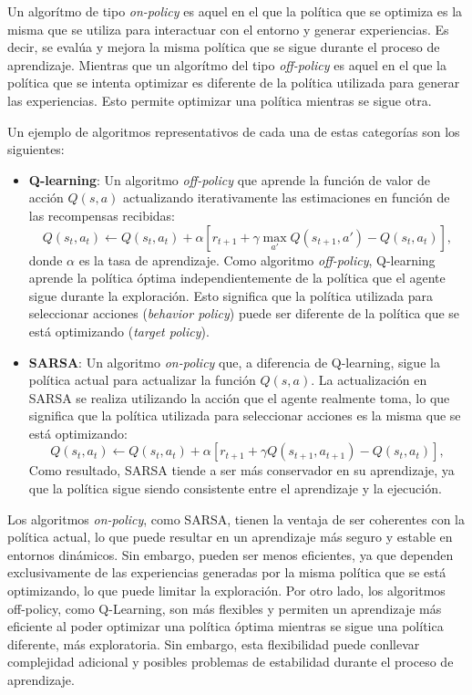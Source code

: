 \documentclass[a4paper,12pt, twoside]{report}
\begin{document}
Un algorítmo de tipo \textit{on-policy} es aquel en el que la política que se optimiza es la misma que 
se utiliza para interactuar con el entorno y generar experiencias. Es decir, se evalúa y mejora la misma
política que se sigue durante el proceso de aprendizaje. Mientras que un algorítmo del tipo \textit{off-policy}
es aquel en el que la política que se intenta optimizar es diferente de la política utilizada para generar
las experiencias. Esto permite optimizar una política mientras se sigue otra.

Un ejemplo de algoritmos representativos de cada una de estas categorías son los siguientes:

\begin{itemize}
    \item \textbf{Q-learning}: Un algoritmo \textit{off-policy} que aprende la función de valor de 
    acción \(Q(s, a)\) actualizando iterativamente las estimaciones en función de las recompensas recibidas:
    \begin{equation}
    Q(s_t, a_t) \leftarrow Q(s_t, a_t) + \alpha \left[r_{t+1} + \gamma \max_{a'} Q(s_{t+1}, a') - Q(s_t, a_t)\right],
    \end{equation}
    donde \(\alpha\) es la tasa de aprendizaje. Como algoritmo \textit{off-policy}, Q-learning aprende la 
    política óptima independientemente de la política que el agente sigue durante la exploración. 
    Esto significa que la política utilizada para seleccionar acciones (\textit{behavior policy}) 
    puede ser diferente de la política que se está optimizando (\textit{target policy}).

    \item \textbf{SARSA}: Un algoritmo \textit{on-policy} que, a diferencia de Q-learning, sigue la 
    política actual para actualizar la función \(Q(s, a)\). La actualización en SARSA se realiza 
    utilizando la acción que el agente realmente toma, lo que significa que la política utilizada 
    para seleccionar acciones es la misma que se está optimizando:
    \begin{equation}
    Q(s_t, a_t) \leftarrow Q(s_t, a_t) + \alpha \left[r_{t+1} + \gamma Q(s_{t+1}, a_{t+1}) - Q(s_t, a_t)\right],
    \end{equation}
    Como resultado, SARSA tiende a ser más conservador en su aprendizaje, ya que la política sigue 
    siendo consistente entre el aprendizaje y la ejecución.

\end{itemize}


Los algoritmos \textit{on-policy}, como SARSA, tienen la ventaja de ser coherentes con la política 
actual, lo que puede resultar en un aprendizaje más seguro y estable en entornos dinámicos. Sin embargo, 
pueden ser menos eficientes, ya que dependen exclusivamente de las experiencias generadas por la misma 
política que se está optimizando, lo que puede limitar la exploración. Por otro lado, los algoritmos 
off-policy, como Q-Learning, son más flexibles y permiten un aprendizaje más eficiente al poder optimizar 
una política óptima mientras se sigue una política diferente, más exploratoria. Sin embargo, esta 
flexibilidad puede conllevar complejidad adicional y posibles problemas de estabilidad durante el 
proceso de aprendizaje.
\end{document}
